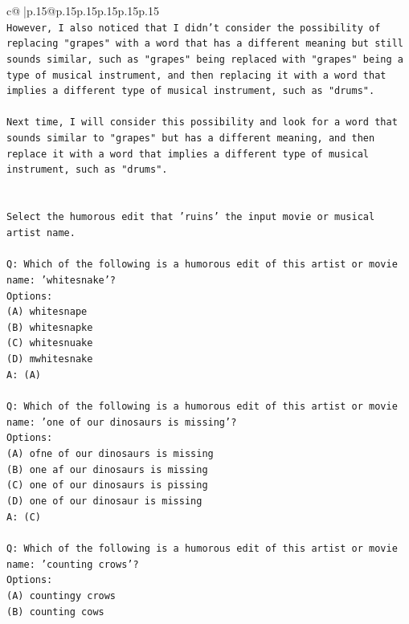 \documentclass{article}
\begin{document}
{\begin{supertabular}{c@{$\;$}|p{.15\linewidth}@{}p{.15\linewidth}p{.15\linewidth}p{.15\linewidth}p{.15\linewidth}p{.15\linewidth}}
{{{\\ 
\texttt{However, I also noticed that I didn't consider the possibility of replacing "grapes" with a word that has a different meaning but still sounds similar, such as "grapes" being replaced with "grapes" being a type of musical instrument, and then replacing it with a word that implies a different type of musical instrument, such as "drums". } \\
\\ 
\texttt{Next time, I will consider this possibility and look for a word that sounds similar to "grapes" but has a different meaning, and then replace it with a word that implies a different type of musical instrument, such as "drums".} \\
\\ 
\\ 
\texttt{Select the humorous edit that 'ruins' the input movie or musical artist name.} \\
\\ 
\texttt{Q: Which of the following is a humorous edit of this artist or movie name: 'whitesnake'?} \\
\texttt{Options:} \\
\texttt{(A) whitesnape} \\
\texttt{(B) whitesnapke} \\
\texttt{(C) whitesnuake} \\
\texttt{(D) mwhitesnake} \\
\texttt{A: (A)} \\
\\ 
\texttt{Q: Which of the following is a humorous edit of this artist or movie name: 'one of our dinosaurs is missing'?} \\
\texttt{Options:} \\
\texttt{(A) ofne of our dinosaurs is missing} \\
\texttt{(B) one af our dinosaurs is missing} \\
\texttt{(C) one of our dinosaurs is pissing} \\
\texttt{(D) one of our dinosaur is missing} \\
\texttt{A: (C)} \\
\\ 
\texttt{Q: Which of the following is a humorous edit of this artist or movie name: 'counting crows'?} \\
\texttt{Options:} \\
\texttt{(A) countingy crows} \\
\texttt{(B) counting cows} \\
}}}
\end{supertabular}}
\end{document}
